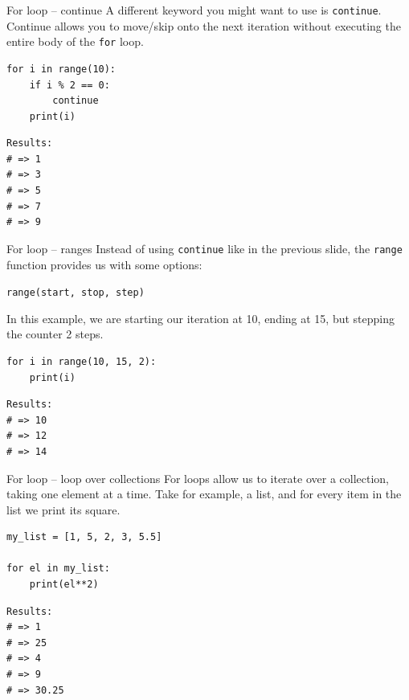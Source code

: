 \documentclass[10pt]{beamer}
\begin{document}
\begin{frame}[label={sec:org2674e82},fragile]{For loop -- continue}
 A different keyword you might want to use is \texttt{continue}. Continue allows you to move/skip
onto the next iteration without executing the entire body of the \texttt{for} loop.

\begin{verbatim}
for i in range(10):
    if i % 2 == 0:
        continue
    print(i)
\end{verbatim}

\begin{verbatim}
Results: 
# => 1
# => 3
# => 5
# => 7
# => 9
\end{verbatim}
\end{frame}

\begin{frame}[label={sec:org5ce128e},fragile]{For loop -- ranges}
 Instead of using \texttt{continue} like in the previous slide, the \texttt{range} function provides us
with some options:

\texttt{range(start, stop, step)}

In this example, we are starting our iteration at 10, ending at 15, but stepping the
counter 2 steps.

\begin{verbatim}
for i in range(10, 15, 2):
    print(i)
\end{verbatim}

\begin{verbatim}
Results: 
# => 10
# => 12
# => 14
\end{verbatim}
\end{frame}

\begin{frame}[label={sec:orgac68d2f},fragile]{For loop -- loop over collections}
 For loops allow us to iterate over a collection, taking one element at a time. Take
for example, a list, and for every item in the list we print its square.

\begin{verbatim}
my_list = [1, 5, 2, 3, 5.5]

for el in my_list:
    print(el**2)
\end{verbatim}

\begin{verbatim}
Results: 
# => 1
# => 25
# => 4
# => 9
# => 30.25
\end{verbatim}
\end{frame}
\end{document}
